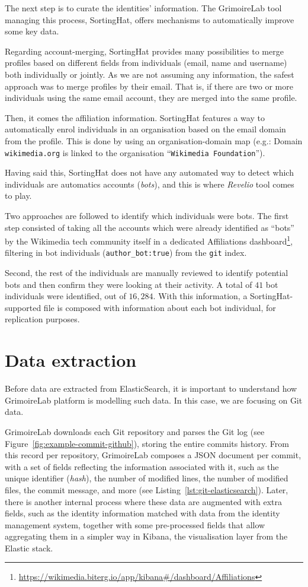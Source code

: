 \documentclass[a4paper, 12pt]{book}
\begin{document}
The next step is to curate the identities' information. The GrimoireLab tool managing this process, SortingHat, offers mechanisms to automatically improve some key data.

Regarding account-merging, SortingHat provides many possibilities to merge profiles based on different fields from individuals (email, name and username) both individually or jointly. As we are not assuming any information, the safest approach was to merge profiles by their email. That is, if there are two or more individuals using the same email account, they are merged into the same profile.

Then, it comes the affiliation information. SortingHat features a way to automatically enrol individuals in an organisation based on the email domain from the profile. This is done by using an organisation-domain map (e.g.: Domain \texttt{wikimedia.org} is linked to the organisation ``\texttt{Wikimedia Foundation}'').

Having said this, SortingHat does not have any automated way to detect which individuals are automatics accounts (\emph{bots}), and this is where \emph{Revelio} tool comes to play.

Two approaches are followed to identify which individuals were bots. The first step consisted of taking all the accounts which were already identified as ``bots'' by the Wikimedia tech community itself in a dedicated Affiliations dashboard\footnote{\url{https://wikimedia.biterg.io/app/kibana\#/dashboard/Affiliations}}, filtering in bot individuals (\texttt{author\_bot:true}) from the \texttt{git} index.

Second, the rest of the individuals are manually reviewed to identify potential bots and then confirm they were looking at their activity. A total of $41$ bot individuals were identified, out of $16,284$. With this information, a SortingHat-supported file is composed with information about each bot individual, for replication purposes.

\section{Data extraction} 
\label{sec:data-extraction}

Before data are extracted from ElasticSearch, it is important to understand how GrimoireLab platform is modelling such data. In this case, we are focusing on Git data.

GrimoireLab downloads each Git repository and parses the Git log (see Figure~\ref{fig:example-commit-github}), storing the entire commits history. From this record per repository, GrimoireLab composes a JSON document per commit, with a set of fields reflecting the information associated with it, such as the unique identifier (\textit{hash}), the number of modified lines, the number of modified files, the commit message, and more (see Listing~\ref{lst:git-elasticsearch}). Later, there is another internal process where these data are augmented with extra fields, such as the identity information matched with data from the identity management system, together with some pre-processed fields that allow aggregating them in a simpler way in Kibana, the visualisation layer from the Elastic stack.
\end{document}
